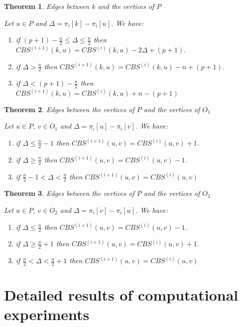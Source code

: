 \documentclass{scrartcl}
\theoremstyle{plain}
\newtheorem{theorem}{Theorem}[section]
\newcommand{\cbs}{CBS}
\begin{document}
\begin{theorem}{Edges between $k$ and the vertices of $P$}

Let $u \in P$ and $\Delta = \pi_i[k] - \pi_i[u]$. We have:
\begin{enumerate}
\item if $(p+1) - \frac{n}{2} \leq \Delta \leq \frac{n}{2}$ then
  $\cbs{}^{(i+1)}(k,u)=\cbs{}^{(i)}(k,u)-2\Delta + (p+1)$.
\item if $\Delta > \frac{n}{2} $ then
  $\cbs{}^{(i+1)}(k,u)=\cbs{}^{(i)}(k,u)- n + (p+1)$.
\item  if $\Delta < (p+1) - \frac{n}{2} $ then
$\cbs{}^{(i+1)}(k,u)=\cbs{}^{(i)}(k,u)+ n - (p+1)$
\end{enumerate}
\end{theorem}

\begin{theorem}{Edges between the vertices of $P$ and the vertices of $O_1$}

Let $u \in P$, $v \in O_1$ and $\Delta = \pi_i[u] - \pi_i[v]$. We have:
\begin{enumerate}
\item if $\Delta \leq \frac{n}{2} - 1$ then
  $\cbs{}^{(i+1)}(u,v)=\cbs{}^{(i)}(u,v) + 1$.
\item if $\Delta \geq \frac{n}{2} $ then
  $\cbs{}^{(i+1)}(u,v)=\cbs{}^{(i)}(u,v) - 1$.
\item  if $\frac{n}{2} - 1 < \Delta < \frac{n}{2} $ then
$\cbs{}^{(i+1)}(u,v)=\cbs{}^{(i)}(u,v)$
\end{enumerate}
\end{theorem}

\begin{theorem}{Edges between the vertices of $P$ and the vertices of $O_2$}

Let $u \in P$, $v \in O_2$ and $\Delta = \pi_i[v] - \pi_i[u]$. We have:
\begin{enumerate}
\item if $\Delta \leq \frac{n}{2}$ then
  $\cbs{}^{(i+1)}(u,v)=\cbs{}^{(i)}(u,v) - 1$.
\item if $\Delta \geq \frac{n}{2} + 1 $ then
  $\cbs{}^{(i+1)}(u,v)=\cbs{}^{(i)}(u,v) + 1$.
\item  if $\frac{n}{2} < \Delta < \frac{n}{2} + 1 $ then
$\cbs{}^{(i+1)}(u,v)=\cbs{}^{(i)}(u,v)$
\end{enumerate}
\end{theorem}


\section{Detailed results of computational experiments}
\label{sec:detailed_results}
\end{document}
